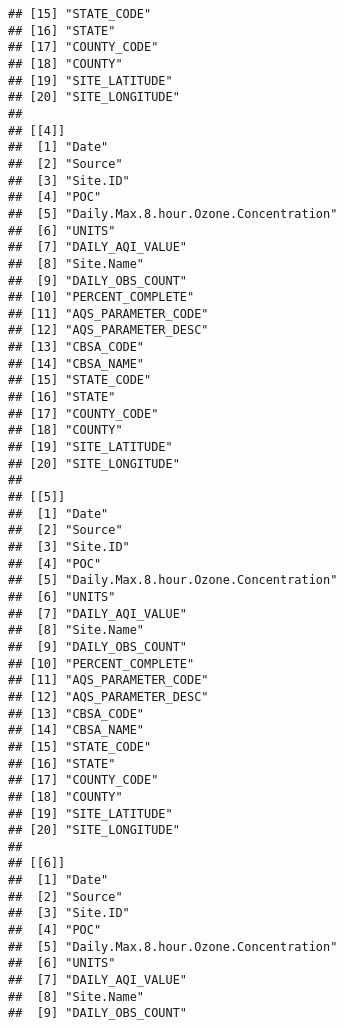 \documentclass[]{article}
\begin{document}
\begin{verbatim}
## [15] "STATE_CODE"                          
## [16] "STATE"                               
## [17] "COUNTY_CODE"                         
## [18] "COUNTY"                              
## [19] "SITE_LATITUDE"                       
## [20] "SITE_LONGITUDE"                      
## 
## [[4]]
##  [1] "Date"                                
##  [2] "Source"                              
##  [3] "Site.ID"                             
##  [4] "POC"                                 
##  [5] "Daily.Max.8.hour.Ozone.Concentration"
##  [6] "UNITS"                               
##  [7] "DAILY_AQI_VALUE"                     
##  [8] "Site.Name"                           
##  [9] "DAILY_OBS_COUNT"                     
## [10] "PERCENT_COMPLETE"                    
## [11] "AQS_PARAMETER_CODE"                  
## [12] "AQS_PARAMETER_DESC"                  
## [13] "CBSA_CODE"                           
## [14] "CBSA_NAME"                           
## [15] "STATE_CODE"                          
## [16] "STATE"                               
## [17] "COUNTY_CODE"                         
## [18] "COUNTY"                              
## [19] "SITE_LATITUDE"                       
## [20] "SITE_LONGITUDE"                      
## 
## [[5]]
##  [1] "Date"                                
##  [2] "Source"                              
##  [3] "Site.ID"                             
##  [4] "POC"                                 
##  [5] "Daily.Max.8.hour.Ozone.Concentration"
##  [6] "UNITS"                               
##  [7] "DAILY_AQI_VALUE"                     
##  [8] "Site.Name"                           
##  [9] "DAILY_OBS_COUNT"                     
## [10] "PERCENT_COMPLETE"                    
## [11] "AQS_PARAMETER_CODE"                  
## [12] "AQS_PARAMETER_DESC"                  
## [13] "CBSA_CODE"                           
## [14] "CBSA_NAME"                           
## [15] "STATE_CODE"                          
## [16] "STATE"                               
## [17] "COUNTY_CODE"                         
## [18] "COUNTY"                              
## [19] "SITE_LATITUDE"                       
## [20] "SITE_LONGITUDE"                      
## 
## [[6]]
##  [1] "Date"                                
##  [2] "Source"                              
##  [3] "Site.ID"                             
##  [4] "POC"                                 
##  [5] "Daily.Max.8.hour.Ozone.Concentration"
##  [6] "UNITS"                               
##  [7] "DAILY_AQI_VALUE"                     
##  [8] "Site.Name"                           
##  [9] "DAILY_OBS_COUNT"                     

\end{verbatim}
\end{document}
